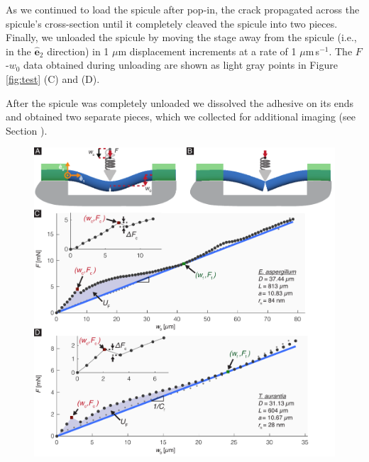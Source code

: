\documentclass[12pt,onecolumn]{article}
\makeatletter
\DeclareRobustCommand*{\nameref}[1]{%
      \emph{\myorg@nameref{#1}}%
    }%
\newcommand{\ey}{\hat{\mathbf{e}}_2}
\makeatother
\begin{document}
\begin{bibunit}
As we continued to load the spicule after pop-in, the crack propagated across the spicule's cross-section until it completely cleaved the spicule into two pieces. Finally, we unloaded the spicule by moving the stage away from the spicule (i.e., in the $\ey$ direction) in 1 $\mu$m displacement increments at a rate of 1 $\mu$m\,s$^{-1}$. The $F$-$w_0$ data obtained during unloading are shown as light gray points in Figure \ref{fig:test} (C) and (D).

After the spicule was completely unloaded we dissolved the adhesive on its ends and obtained two separate pieces, which we collected for additional imaging (see Section \nameref{sec:fracto}).
%
			\begin{figure}[ht!]
			\centering
			\includegraphics[width=\textwidth]{../Figures/FigureTest/Figure4_V7A.pdf}

\end{figure}
\end{bibunit}
\end{document}
